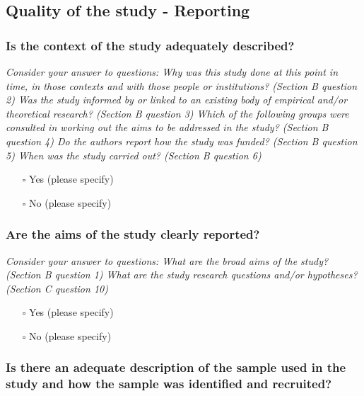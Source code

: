 \documentclass[
  doc, a4paper]{apa7}
\providecommand{\tightlist}{%
  \setlength{\itemsep}{0pt}\setlength{\parskip}{0pt}}
\begin{document}
\subsection{Quality of the study - Reporting}\label{quality-of-the-study---reporting}

\subsubsection{Is the context of the study adequately described?}\label{is-the-context-of-the-study-adequately-described}

\emph{Consider your answer to questions: Why was this study done at this point in time, in those contexts and with those people or institutions? (Section B question 2) Was the study informed by or linked to an existing body of empirical and/or theoretical research? (Section B question 3) Which of the following groups were consulted in working out the aims to be addressed in the study? (Section B question 4) Do the authors report how the study was funded? (Section B question 5) When was the study carried out? (Section B question 6)}

\begin{itemize}
\tightlist
\item[$\square$]
  Yes (please specify)
\item[$\square$]
  No (please specify)
\end{itemize}

\subsubsection{Are the aims of the study clearly reported?}\label{are-the-aims-of-the-study-clearly-reported}

\emph{Consider your answer to questions: What are the broad aims of the study? (Section B question 1) What are the study research questions and/or hypotheses? (Section C question 10)}

\begin{itemize}
\tightlist
\item[$\square$]
  Yes (please specify)
\item[$\square$]
  No (please specify)
\end{itemize}

\subsubsection{Is there an adequate description of the sample used in the study and how the sample was identified and recruited?}\label{is-there-an-adequate-description-of-the-sample-used-in-the-study-and-how-the-sample-was-identified-and-recruited}
\end{document}
